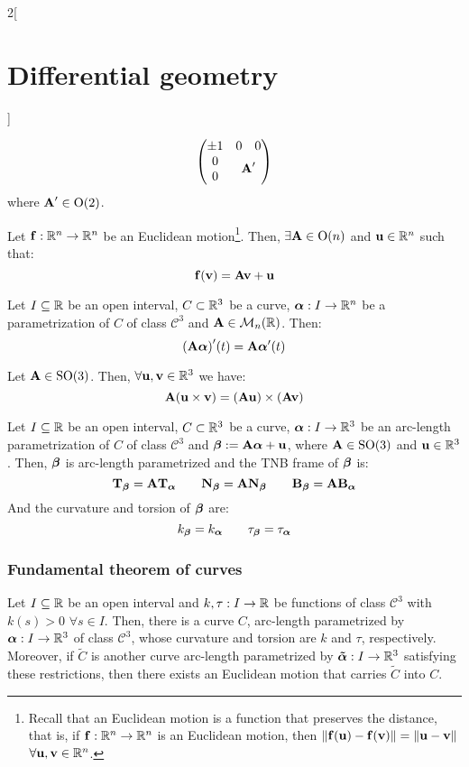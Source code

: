\documentclass[../../../main.tex]{subfiles}
\begin{document}
\begin{multicols}{2}[\section{Differential geometry}]
\begin{proposition}
$$\begin{pmatrix}
        \pm 1 & 0                                              & 0 \\
        0     & \multicolumn{2}{c}{\multirow{2}{*}{$\vf{A}'$}}     \\
        0     &                                                &
      \end{pmatrix}$$
    where $\boldsymbol{\mathrm{A}}'\in\text{O}(2)$.
  \end{proposition}
  \begin{proposition}
    Let $\boldsymbol{\mathrm{f}}:\mathbb{R}^n\rightarrow\mathbb{R}^n$ be an Euclidean motion\footnote{Recall that an Euclidean motion is a function that preserves the distance, that is, if $\boldsymbol{\mathrm{f}}:\mathbb{R}^n\rightarrow\mathbb{R}^n$ is an Euclidean motion, then $\|\boldsymbol{\mathrm{f}}(\boldsymbol{\mathrm{u}})-\boldsymbol{\mathrm{f}}(\boldsymbol{\mathrm{v}})\|=\|\boldsymbol{\mathrm{u}}-\boldsymbol{\mathrm{v}}\|$ $\forall \boldsymbol{\mathrm{u}},\boldsymbol{\mathrm{v}}\in\mathbb{R}^n$.}. Then, $\exists\boldsymbol{\mathrm{A}}\in\text{O}(n)$ and $\boldsymbol{\mathrm{u}}\in\mathbb{R}^n$ such that: $$\boldsymbol{\mathrm{f}}(\boldsymbol{\mathrm{v}})=\boldsymbol{\mathrm{Av}}+\boldsymbol{\mathrm{u}}$$
  \end{proposition}
  \begin{proposition}
    Let $I\subseteq\mathbb{R}$ be an open interval, $C\subset\mathbb{R}^3$ be a curve, $\boldsymbol{\mathrm{\alpha}}:I\rightarrow\mathbb{R}^n$ be a parametrization of $C$ of class $\mathcal{C}^3$ and $\boldsymbol{\mathrm{A}}\in\mathcal{M}_n(\mathbb{R})$. Then:
    $${\left(\boldsymbol{\mathrm{A}}\boldsymbol{\mathrm{\alpha}}\right)}'(t)=\boldsymbol{\mathrm{A}}\boldsymbol{\mathrm{\alpha}}'(t)$$
  \end{proposition}
  \begin{proposition}
    Let $\boldsymbol{\mathrm{A}}\in\text{SO}(3)$. Then, $\forall \boldsymbol{\mathrm{u}},\boldsymbol{\mathrm{v}}\in\mathbb{R}^3$ we have: $$\boldsymbol{\mathrm{A}}(\boldsymbol{\mathrm{u}}\times\boldsymbol{\mathrm{v}})=\left(\boldsymbol{\mathrm{Au}}\right)\times\left(\boldsymbol{\mathrm{Av}}\right)$$
  \end{proposition}
  \begin{corollary}
    Let $I\subseteq\mathbb{R}$ be an open interval, $C\subset\mathbb{R}^3$ be a curve, $\boldsymbol{\mathrm{\alpha}}:I\rightarrow\mathbb{R}^3$ be an arc-length parametrization of $C$ of class $\mathcal{C}^3$ and $\boldsymbol{\mathrm{\beta}}:=\boldsymbol{\mathrm{A\alpha}}+\boldsymbol{\mathrm{u}}$, where $\boldsymbol{\mathrm{A}}\in\text{SO}(3)$ and $\boldsymbol{\mathrm{u}}\in\mathbb{R}^3$. Then, $\boldsymbol{\mathrm{\beta}}$ is arc-length parametrized and the TNB frame of $\boldsymbol{\mathrm{\beta}}$ is:
    $${\boldsymbol{\mathrm{T}}_{\boldsymbol{\mathrm{\beta}}}}=\boldsymbol{\mathrm{A}}{\boldsymbol{\mathrm{T}}_{\boldsymbol{\mathrm{\alpha}}}}\qquad{\boldsymbol{\mathrm{N}}_{\boldsymbol{\mathrm{\beta}}}}=\boldsymbol{\mathrm{A}}{\boldsymbol{\mathrm{N}}_{\boldsymbol{\mathrm{\beta}}}}\qquad{\boldsymbol{\mathrm{B}}_{\boldsymbol{\mathrm{\beta}}}}=\boldsymbol{\mathrm{A}}{\boldsymbol{\mathrm{B}}_{\boldsymbol{\mathrm{\alpha}}}}$$
    And the curvature and torsion of $\boldsymbol{\mathrm{\beta}}$ are: $$k_{\boldsymbol{\mathrm{\beta}}}=k_{\boldsymbol{\mathrm{\alpha}}}\qquad{\tau_{\boldsymbol{\mathrm{\beta}}}}={\tau_{\boldsymbol{\mathrm{\alpha}}}}$$
  \end{corollary}
  \subsubsection{Fundamental theorem of curves}
  \begin{theorem}
    Let $I\subseteq\mathbb{R}$ be an open interval and $k,\tau:I\rightarrow\mathbb{R}$ be functions of class $\mathcal{C}^3$ with $k(s)>0$ $\forall s\in I$. Then, there is a curve $C$, arc-length parametrized by $\boldsymbol{\mathrm{\alpha}}:I\rightarrow\mathbb{R}^3$ of class $\mathcal{C}^3$, whose curvature and torsion are $k$ and $\tau$, respectively. Moreover, if $\tilde{C}$ is another curve arc-length parametrized by $\boldsymbol{\mathrm{\tilde{\alpha}}}:I\rightarrow\mathbb{R}^3$ satisfying these restrictions, then there exists an Euclidean motion that carries $\tilde{C}$ into $C$.
  \end{theorem}

\end{multicols}
\end{document}
